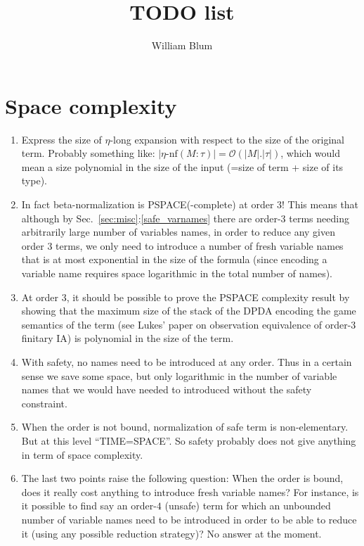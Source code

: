 \documentclass{article}
\title{TODO list}
\author{William Blum}
\begin{document}
\maketitle

\section{Space complexity}
\begin{enumerate}

\item Express the size of $\eta$-long expansion with respect to the size of the original term. Probably something like: $|\eta\mbox{-nf}(M:\tau)| = \mathcal{O}(|M|.|\tau|)$, which would mean a size polynomial in the size of the input (=size of term + size of its type).

\item In fact beta-normalization is PSPACE(-complete) at order 3! This means that although by Sec.~\ref{sec:misc}:\ref{safe_varnames} there are order-3 terms needing arbitrarily large number of variables names, in order to reduce any given order 3 terms, we only need to introduce a number of fresh variable names that is at most exponential in the size of the formula (since encoding a variable name requires space logarithmic in the total number of names).

\item At order 3, it should be possible to prove the PSPACE complexity result by showing that the maximum size of the stack of the DPDA encoding the game semantics of the term (see Lukes' paper on observation equivalence of order-3 finitary IA) is polynomial in the size of the term.


\item With safety, no names need to be introduced at any order. Thus in a certain sense we save some space, but only logarithmic in the number of variable names that we would have needed to introduced without the safety constraint.

\item When the order is not bound, normalization of safe term is non-elementary.
But at this level ``TIME=SPACE''. So safety probably does not give anything in term of space complexity.

\item The last two points raise the following question: When the order is bound, does it really cost anything to introduce fresh variable names? For instance, is it possible to find say an order-$4$ (unsafe) term for which an unbounded number of variable names need to be introduced in order to be able to reduce it (using any possible reduction strategy)?
    No answer at the moment.


\end{enumerate}
\end{document}
